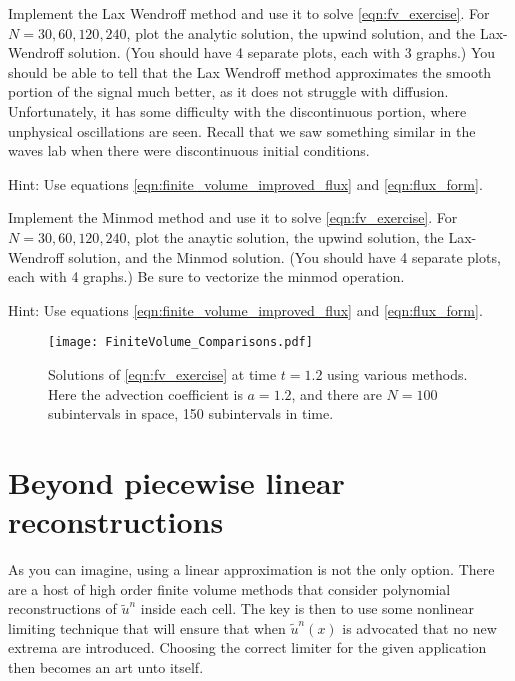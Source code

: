 
\begin{problem}
Implement the Lax Wendroff method and use it to solve \eqref{eqn:fv_exercise}.
For $N=30,60,120,240$, plot the analytic solution, the upwind solution, and the Lax-Wendroff solution.
(You should have 4 separate plots, each with 3 graphs.)
You should be able to tell that the Lax Wendroff method approximates the smooth portion of the signal much better, as it does not struggle with diffusion.
Unfortunately, it has some difficulty with the discontinuous portion, where unphysical oscillations are seen.
Recall that we saw something similar in the waves lab when there were discontinuous initial conditions.

Hint: Use equations \ref{eqn:finite_volume_improved_flux} and \ref{eqn:flux_form}.
\end{problem}

\begin{problem}
Implement the Minmod method and use it to solve \eqref{eqn:fv_exercise}.
For $N=30,60,120,240$, plot the anaytic solution, the upwind solution, the Lax-Wendroff solution, and the Minmod solution.
(You should have 4 separate plots, each with 4 graphs.)
Be sure to vectorize the minmod operation.

Hint: Use equations \ref{eqn:finite_volume_improved_flux} and \ref{eqn:flux_form}.
\end{problem}

\begin{figure}
\centering
\texttt{[image: FiniteVolume\_Comparisons.pdf]}
\caption{Solutions of \eqref{eqn:fv_exercise} at time $t = 1.2$ using various methods.
Here the advection coefficient is $a = 1.2$, and there are  $N = 100$ subintervals in space, 150 subintervals in time.}
\label{fig:fv_Comparisons}
\end{figure}

\section*{Beyond piecewise linear reconstructions}
As you can imagine, using a linear approximation is not the only option.
There are a host of high order finite volume methods that consider polynomial reconstructions of $\tilde{u}^n$ inside each cell.
The key is then to use some nonlinear limiting technique that will ensure that when $\tilde{u}^n(x)$ is advocated that no new extrema are introduced.
Choosing the correct limiter for the given application then becomes an art unto itself.
